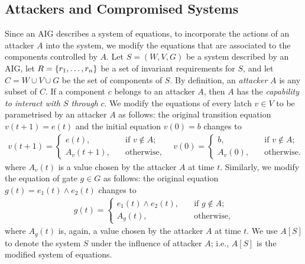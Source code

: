 {\subsection{Attackers and Compromised Systems}
Since an AIG describes a system of equations, to incorporate the actions of an attacker $A$ into the system, we modify the equations that are associated to the components controlled by $A$. Let $S=(W,V,G)$ be a system described by an AIG, let $R=\left\{r_1, \ldots, r_n\right\}$ be a set of invariant requirements for $S$, and let $C=W\cup V\cup G$ be the set of components of $S$. By definition, an \emph{attacker} $A$ is any subset of $C$. If a component $c$ belongs to an attacker $A$, then $A$ has the \emph{capability to interact with $S$ through} $c$. We modify the equations of every latch $v\in V$ to be parametrised by an attacker $A$ as follows: the original transition equation $v(t+1)=e(t)$ and the initial equation $v(0)=b$ changes to
\begin{align}
\label{eq:badLatch}
v(t+1) = \begin{cases}
e(t), \quad &\text{if $v\not \in A$;}\\
A_v(t+1), \quad &\text{otherwise},
\end{cases}
\quad 
v(0)= \begin{cases}
b, \quad &\text{if $v \not \in A$;}\\
A_v(0), \quad &\text{otherwise.}
\end{cases}
\end{align}
where $A_v(t)$ is a value chosen by the attacker $A$ at time $t$. Similarly, we modify the equation of gate $g\in G$ as follows: the original equation $g(t)=e_1(t)\land e_2(t)$ changes to
\begin{align}
\label{eq:badGate}
g(t) = \begin{cases}
e_1(t)\land e_2(t), \quad &\text{if $g\not \in A$;}\\
A_g(t), \quad &\text{otherwise},
\end{cases}
\end{align}
where $A_g(t)$ is, again, a value chosen by the attacker $A$ at time $t$. We use $A[S]$ to denote the system $S$ under the influence of attacker $A$; i.e., $A[S]$ is the modified system of equations. 

}
